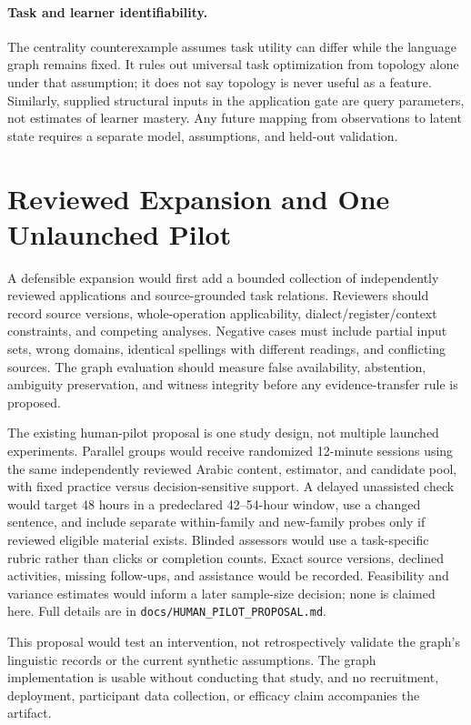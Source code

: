 \documentclass{article}
\newcommand{\artifact}[1]{\nolinkurl{#1}}
\begin{document}
\paragraph{Task and learner identifiability.}
The centrality counterexample assumes task utility can differ while the language graph remains fixed. It rules out universal task optimization from topology alone under that assumption; it does not say topology is never useful as a feature. Similarly, supplied structural inputs in the application gate are query parameters, not estimates of learner mastery. Any future mapping from observations to latent state requires a separate model, assumptions, and held-out validation.

\section{Reviewed Expansion and One Unlaunched Pilot}
\label{app:pilot}

A defensible expansion would first add a bounded collection of independently reviewed applications and source-grounded task relations. Reviewers should record source versions, whole-operation applicability, dialect/register/context constraints, and competing analyses. Negative cases must include partial input sets, wrong domains, identical spellings with different readings, and conflicting sources. The graph evaluation should measure false availability, abstention, ambiguity preservation, and witness integrity before any evidence-transfer rule is proposed.

The existing human-pilot proposal is one study design, not multiple launched experiments. Parallel groups would receive randomized 12-minute sessions using the same independently reviewed Arabic content, estimator, and candidate pool, with fixed practice versus decision-sensitive support. A delayed unassisted check would target 48 hours in a predeclared 42--54-hour window, use a changed sentence, and include separate within-family and new-family probes only if reviewed eligible material exists. Blinded assessors would use a task-specific rubric rather than clicks or completion counts. Exact source versions, declined activities, missing follow-ups, and assistance would be recorded. Feasibility and variance estimates would inform a later sample-size decision; none is claimed here. Full details are in \artifact{docs/HUMAN_PILOT_PROPOSAL.md}.

This proposal would test an intervention, not retrospectively validate the graph's linguistic records or the current synthetic assumptions. The graph implementation is usable without conducting that study, and no recruitment, deployment, participant data collection, or efficacy claim accompanies the artifact.
\end{document}
